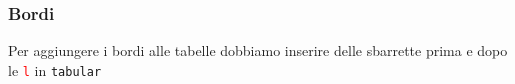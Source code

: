 \begin{frame}
 
  \frametitle{Bordi}
  
  Per aggiungere i bordi alle tabelle dobbiamo inserire delle sbarrette prima e 
dopo le \texttt{\textcolor{red}{l}} in \texttt{tabular}
\end{frame}
